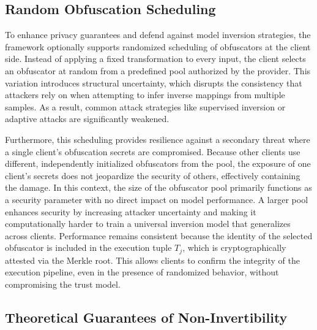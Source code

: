\documentclass{ieeeaccess}
\begin{document}
\subsection{Random Obfuscation Scheduling}
{To enhance privacy guarantees and defend against model inversion strategies, the framework optionally supports randomized scheduling of obfuscators at the client side. Instead of applying a fixed transformation to every input, the client selects an obfuscator at random from a predefined pool authorized by the provider. This variation introduces structural uncertainty, which disrupts the consistency that attackers rely on when attempting to infer inverse mappings from multiple samples. As a result, common attack strategies like supervised inversion or adaptive attacks are significantly weakened.

Furthermore, this scheduling provides resilience against a secondary threat where a single client's obfuscation secrets are compromised. Because other clients use different, independently initialized obfuscators from the pool, the exposure of one client’s secrets does not jeopardize the security of others, effectively containing the damage. In this context, the size of the obfuscator pool primarily functions as a security parameter with no direct impact on model performance. A larger pool enhances security by increasing attacker uncertainty and making it computationally harder to train a universal inversion model that generalizes across clients. Performance remains consistent because the identity of the selected obfuscator is included in the execution tuple $T_j$, which is cryptographically attested via the Merkle root. This allows clients to confirm the integrity of the execution pipeline, even in the presence of randomized behavior, without compromising the trust model.}

\subsection{Theoretical Guarantees of Non-Invertibility}
\end{document}
